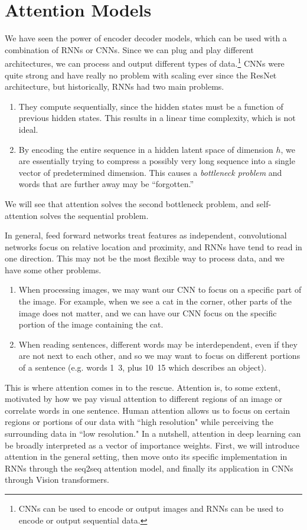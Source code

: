 \section{Attention Models}

  We have seen the power of encoder decoder models, which can be used with a combination of RNNs or CNNs. Since we can plug and play different architectures, we can process and output different types of data.\footnote{CNNs can be used to encode or output images and RNNs can be used to encode or output sequential data.} CNNs were quite strong and have really no problem with scaling ever since the ResNet architecture, but historically, RNNs had two main problems. 
  \begin{enumerate} 
    \item They compute sequentially, since the hidden states must be a function of previous hidden states. This results in a linear time complexity, which is not ideal. 
    \item By encoding the entire sequence in a hidden latent space of dimension $h$, we are essentially trying to compress a possibly very long sequence into a single vector of predetermined dimension. This causes a \textit{bottleneck problem} and words that are further away may be ``forgotten.''
  \end{enumerate}

  We will see that attention solves the second bottleneck problem, and self-attention solves the sequential problem. 

  In general, feed forward networks treat features as independent, convolutional networks focus on relative location and proximity, and RNNs have tend to read in one direction. This may not be the most flexible way to process data, and we have some other problems. 
  \begin{enumerate}
      \item When processing images, we may want our CNN to focus on a specific part of the image. For example, when we see a cat in the corner, other parts of the image does not matter, and we can have our CNN focus on the specific portion of the image containing the cat. 
      \item When reading sentences, different words may be interdependent, even if they are not next to each other, and so we may want to focus on different portions of a sentence (e.g. words 1~3, plus 10~15 which describes an object). 
  \end{enumerate}

  This is where attention comes in to the rescue. Attention is, to some extent, motivated by how we pay visual attention to different regions of an image or correlate words in one sentence. Human attention allows us to focus on certain regions or portions of our data with ``high resolution" while perceiving the surrounding data in ``low resolution." In a nutshell, attention in deep learning can be broadly interpreted as a vector of importance weights. First, we will introduce attention in the general setting, then move onto its specific implementation in RNNs through the seq2seq attention model, and finally its application in CNNs through Vision transformers. 


